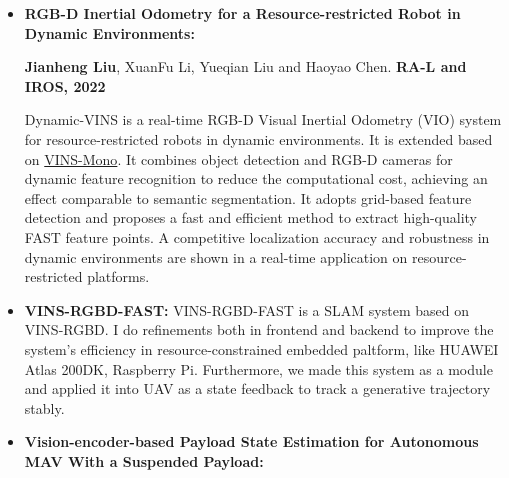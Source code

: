 \documentclass[11pt,a4paper,sans]{moderncv}        %
\begin{document}
{\vspace{6pt}

\begin{itemize}

\item \textbf{RGB-D Inertial Odometry for a Resource-restricted Robot in Dynamic Environments:} 

\textbf{Jianheng Liu}, XuanFu Li, Yueqian Liu and Haoyao Chen. \textbf{RA-L and IROS, 2022}

Dynamic-VINS is a real-time RGB-D Visual Inertial Odometry (VIO) system for resource-restricted robots in dynamic environments. It is extended based on \href{https://github.com/HKUST-Aerial-Robotics/VINS-Mono}{VINS-Mono}. It combines object detection and RGB-D cameras for dynamic feature recognition to reduce the computational cost, achieving an effect comparable to semantic segmentation. It adopts grid-based feature detection and proposes a fast and efficient method to extract high-quality FAST feature points. A competitive localization accuracy and robustness in dynamic environments are shown in a real-time application on  resource-restricted platforms.

\vspace{6pt}

\item \textbf{VINS-RGBD-FAST:} VINS-RGBD-FAST is a SLAM system based on VINS-RGBD. I do refinements both in frontend and backend to improve the system's efficiency in resource-constrained embedded paltform, like HUAWEI Atlas 200DK, Raspberry Pi. Furthermore, we made this system as a module and applied it into UAV as a state feedback to track a generative trajectory stably. 

\vspace{6pt}

\item \textbf{Vision-encoder-based Payload State Estimation for Autonomous MAV With a Suspended Payload:} 


\end{itemize}}
\end{document}
